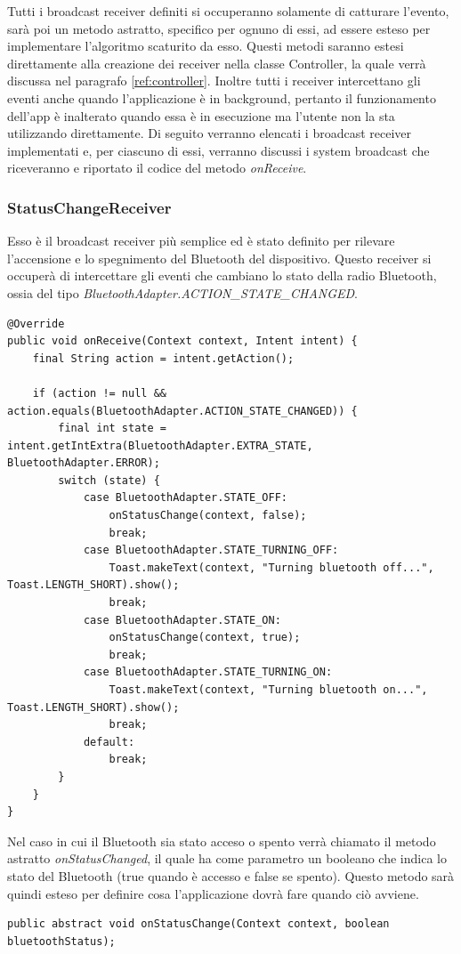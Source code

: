 Tutti i broadcast receiver definiti si occuperanno solamente di catturare l'evento, sarà poi un metodo astratto, specifico per ognuno di essi, ad essere esteso per implementare l'algoritmo scaturito da esso. Questi metodi saranno estesi direttamente alla creazione dei receiver nella classe Controller, la quale verrà discussa nel paragrafo \ref{ref:controller}. Inoltre tutti i receiver intercettano gli eventi anche quando l'applicazione è in background, pertanto il funzionamento dell'app è inalterato quando essa è in esecuzione ma l'utente non la sta utilizzando direttamente. Di seguito verranno elencati i broadcast receiver implementati e, per ciascuno di essi, verranno discussi i system broadcast che riceveranno e riportato il codice del metodo \textit{onReceive}.

\subsubsection{StatusChangeReceiver}
Esso è il broadcast receiver più semplice ed è stato definito per rilevare l'accensione e lo spegnimento del Bluetooth del dispositivo. Questo receiver si occuperà di intercettare gli eventi che cambiano lo stato della radio Bluetooth, ossia del tipo \textit{BluetoothAdapter.ACTION\_STATE\_CHANGED}.
\begin{verbatim}
@Override
public void onReceive(Context context, Intent intent) {
    final String action = intent.getAction();

    if (action != null && action.equals(BluetoothAdapter.ACTION_STATE_CHANGED)) {
        final int state = intent.getIntExtra(BluetoothAdapter.EXTRA_STATE, BluetoothAdapter.ERROR);
        switch (state) {
            case BluetoothAdapter.STATE_OFF:
                onStatusChange(context, false);
                break;
            case BluetoothAdapter.STATE_TURNING_OFF:
                Toast.makeText(context, "Turning bluetooth off...", Toast.LENGTH_SHORT).show();
                break;
            case BluetoothAdapter.STATE_ON:
                onStatusChange(context, true);
                break;
            case BluetoothAdapter.STATE_TURNING_ON:
                Toast.makeText(context, "Turning bluetooth on...", Toast.LENGTH_SHORT).show();
                break;
            default:
                break;
        }
    }
}
\end{verbatim}

Nel caso in cui il Bluetooth sia stato acceso o spento verrà chiamato il metodo astratto \textit{onStatusChanged}, il quale ha come parametro un booleano che indica lo stato del Bluetooth (true quando è accesso e false se spento). Questo metodo sarà quindi esteso per definire cosa l'applicazione dovrà fare quando ciò avviene.
\begin{verbatim}
public abstract void onStatusChange(Context context, boolean bluetoothStatus);
\end{verbatim}


